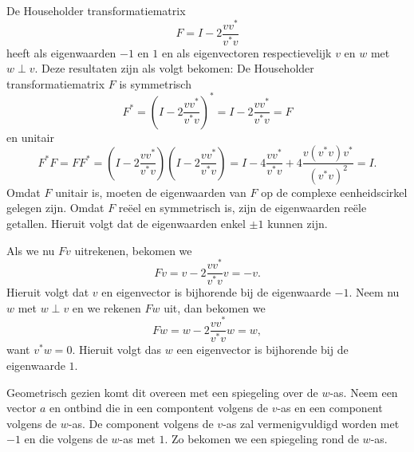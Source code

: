 De Householder transformatiematrix
$$F=I - 2\frac{vv^*}{v^*v}$$
heeft als eigenwaarden $-1$ en $1$ en als eigenvectoren respectievelijk $v$ en $w$ met $w \perp v$. Deze resultaten zijn als volgt bekomen:
De Householder transformatiematrix $F$ is symmetrisch 
$$F^* = (I - 2\frac{vv^*}{v^*v})^* = I - 2\frac{vv^*}{v^*v} = F$$
en unitair
$$F^*F = FF^* = (I - 2\frac{vv^*}{v^*v})(I - 2\frac{vv^*}{v^*v}) = I - 4\frac{vv^*}{v^*v} + 4\frac{v(v^*v)v^*}{(v^{*}v)^2} = I.$$
Omdat $F$ unitair is, moeten de eigenwaarden van $F$ op de complexe eenheidscirkel gelegen zijn.
Omdat $F$ re\"eel en symmetrisch is, zijn de eigenwaarden re\"ele getallen.
Hieruit volgt dat de eigenwaarden enkel $\pm 1$ kunnen zijn.

Als we nu $Fv$ uitrekenen, bekomen we
$$Fv = v - 2\frac{vv^*}{v^*v}v = -v.$$
Hieruit volgt dat $v$ en eigenvector is bijhorende bij de eigenwaarde $-1$.
Neem nu $w$ met $w \perp v$ en we rekenen $Fw$ uit, dan bekomen we
$$Fw = w - 2\frac{vv^*}{v^*v}w = w,$$
want $v^*w = 0$. Hieruit volgt das $w$ een eigenvector is bijhorende bij de eigenwaarde $1$.

Geometrisch gezien komt dit overeen met een spiegeling over de $w$-as. Neem een vector $a$ en ontbind die in een compontent volgens de $v$-as en een component volgens de $w$-as. De component volgens de $v$-as zal vermenigvuldigd worden met $-1$ en die volgens de $w$-as met $1$. Zo bekomen we een spiegeling rond de $w$-as.